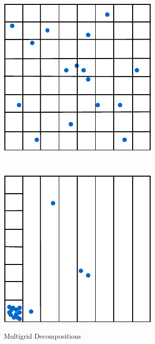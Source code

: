 \begin{figure}
	\begin{center}
		\begin{subfloat}{%
			\includegraphics[scale=0.65]{figures/multigrid_decomposition.pdf}
		}
		\end{subfloat}~~~~~
		\begin{subfloat}{%
			\includegraphics[scale=0.65]{figures/multigrid_clustered.pdf}
		}
		\end{subfloat}
	\end{center}

	\caption{Multigrid Decompositions}
	\label{fig:multigrid-decompositions}
\end{figure}

